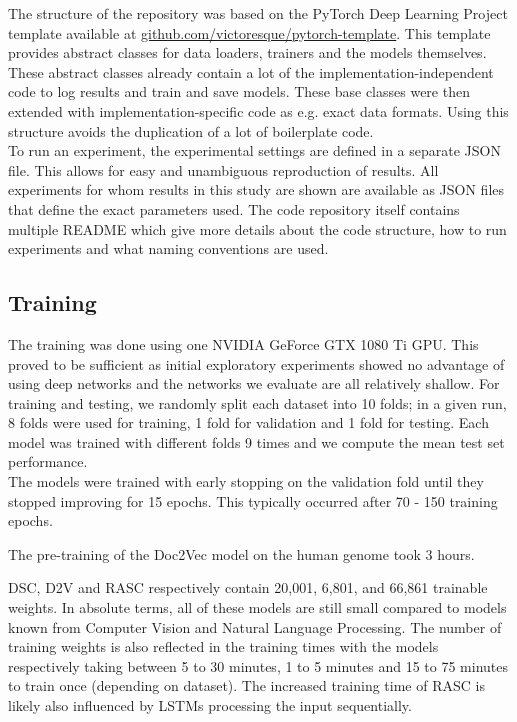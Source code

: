 The structure of the repository was based on the PyTorch Deep Learning Project template available at \url{github.com/victoresque/pytorch-template}. This template provides abstract classes for data loaders, trainers and the models themselves. These abstract classes already contain a lot of the implementation-independent code to log results and train and save models. These base classes were then extended with implementation-specific code as e.g. exact data formats. Using this structure avoids the duplication of a lot of boilerplate code.\\
To run an experiment, the experimental settings are defined in a separate JSON file. This allows for easy and unambiguous reproduction of results. All experiments for whom results in this study are shown are available as JSON files that define the exact parameters used.
The code repository itself contains multiple README which give more details about the code structure, how to run experiments and what naming conventions are used. 


\subsection{Training} \label{subsec:training_details}
The training was done using one NVIDIA GeForce GTX 1080 Ti GPU. This proved to be sufficient as initial exploratory experiments showed no advantage of using deep networks and the networks we evaluate are all relatively shallow. For training and testing, we randomly split each dataset into 10 folds; in a given run, 8 folds were used for training, 1 fold for validation and 1 fold for testing. Each model was trained with different folds 9 times and we compute the mean test set performance.\\
The models were trained with early stopping on the validation fold until they stopped improving for 15 epochs. This typically occurred after 70 - 150 training epochs.

The pre-training of the Doc2Vec model on the human genome took 3 hours. 

DSC, D2V and RASC respectively contain 20,001, 6,801, and 66,861 trainable weights. In absolute terms, all of these models are still small compared to models known from Computer Vision and Natural Language Processing. The number of training weights is also reflected in the training times with the models respectively taking between 5 to 30 minutes, 1 to 5 minutes and 15 to 75 minutes to train once (depending on dataset). The increased training time of RASC is likely also influenced by LSTMs processing the input sequentially.

